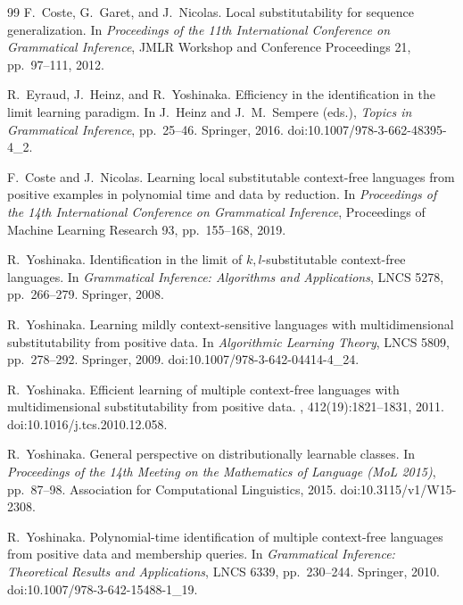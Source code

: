 \documentclass[11pt,a4paper]{ltjsarticle}
\numberwithin{equation}{section}
\theoremstyle{plain}
\theoremstyle{definition}
\theoremstyle{remark}
\begin{document}
\begin{thebibliography}{99}
F.~Coste, G.~Garet, and J.~Nicolas.
\newblock Local substitutability for sequence generalization.
\newblock In {\em Proceedings of the 11th International Conference on
Grammatical Inference}, JMLR Workshop and Conference Proceedings 21,
pp.~97--111, 2012.

R.~Eyraud, J.~Heinz, and R.~Yoshinaka.
\newblock Efficiency in the identification in the limit learning paradigm.
\newblock In J.~Heinz and J.~M.~Sempere (eds.), {\em Topics in Grammatical
Inference}, pp.~25--46. Springer, 2016.
\newblock doi:10.1007/978-3-662-48395-4\_2.

F.~Coste and J.~Nicolas.
\newblock Learning local substitutable context-free languages from positive
examples in polynomial time and data by reduction.
\newblock In {\em Proceedings of the 14th International Conference on
Grammatical Inference}, Proceedings of Machine Learning Research 93,
pp.~155--168, 2019.

R.~Yoshinaka.
\newblock Identification in the limit of $k,l$-substitutable context-free
languages.
\newblock In {\em Grammatical Inference: Algorithms and Applications},
LNCS 5278, pp.~266--279. Springer, 2008.

R.~Yoshinaka.
\newblock Learning mildly context-sensitive languages with multidimensional
 substitutability from positive data.
\newblock In {\em Algorithmic Learning Theory}, LNCS 5809, pp.~278--292.
 Springer, 2009.
\newblock doi:10.1007/978-3-642-04414-4\_24.

R.~Yoshinaka.
\newblock Efficient learning of multiple context-free languages with
multidimensional substitutability from positive data.
, 412(19):1821--1831, 2011.
\newblock doi:10.1016/j.tcs.2010.12.058.

R.~Yoshinaka.
\newblock General perspective on distributionally learnable classes.
\newblock In \emph{Proceedings of the 14th Meeting on the Mathematics
of Language (MoL 2015)}, pp.~87--98.
Association for Computational Linguistics, 2015.
\newblock doi:10.3115/v1/W15-2308.

R.~Yoshinaka.
\newblock Polynomial-time identification of multiple context-free languages
from positive data and membership queries.
\newblock In {\em Grammatical Inference: Theoretical Results and Applications},
LNCS 6339, pp.~230--244. Springer, 2010.
\newblock doi:10.1007/978-3-642-15488-1\_19.


\end{thebibliography}
\end{document}
